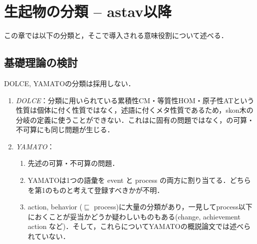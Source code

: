 \documentclass[../../main-detail.tex]{subfiles}
\begin{document}
\chapter{生起物の分類 -- astav以降}
この章では以下の分類と，そこで導入される意味役割について述べる．
\section{基礎理論の検討}
\begin{remark}
DOLCE, YAMATOの分類は採用しない．
\begin{enumerate}
    \item \emph{DOLCE}：分類に用いられている累積性CM・等質性HOM・原子性ATという性質は個体に付く性質ではなく，述語に付くメタ性質であるため，skon木の分岐の定義に使うことができない．これはに固有の問題ではなく，の可算・不可算にも同じ問題が生じる．
    \item \emph{YAMATO}：
    \begin{enumerate}
        \item 先述の可算・不可算の問題．
        \item YAMATOは1つの語彙を event と process の両方に割り当てる．どちらを第1のものと考えて登録すべきかが不明．
        \item action, behavior ($\sqsubseteq$ process)に大量の分類があり，一見してprocess以下におくことが妥当かどうか疑わしいものもある(change, achievement action など)．そして，これらについてYAMATOの概説論文では述べられていない．
    \end{enumerate}
\end{enumerate}

\end{remark}

\end{document}
